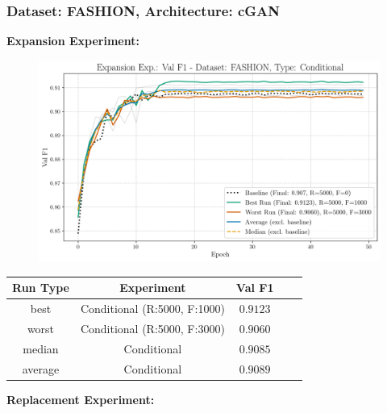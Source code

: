 \subsubsection{Dataset: FASHION, Architecture: cGAN}
\noindent\textbf{Expansion Experiment:}
\begin{figure}[htbp]
	\centering
	\includegraphics[width=.85\textwidth]{abb/strat_classifier_performance/FASHION_STRATIFIED_CLASSIFIERS_COND_GAN/expansion_experiments/val_f1_score_['COND']_FASHION_all.png}
	\label{fig:app_strat_class_performance_expansion_exp._val_f1_score_}
\end{figure}
\begin{table}[H]
	\centering
	\vspace{-1em}
	\begin{tabular}{|c|c|c|c|c|}
		\hline
		Run Type & Experiment & Val F1 \\ \hline
		best & Conditional (R:5000, F:1000) & $0.9123$\\ \hline
		worst & Conditional (R:5000, F:3000) & $0.9060$\\ \hline
		median & Conditional & $0.9085$\\ \hline
		average & Conditional & $0.9089$
		\\ \hline
	\end{tabular}
\end{table}
\noindent\textbf{Replacement Experiment:}

